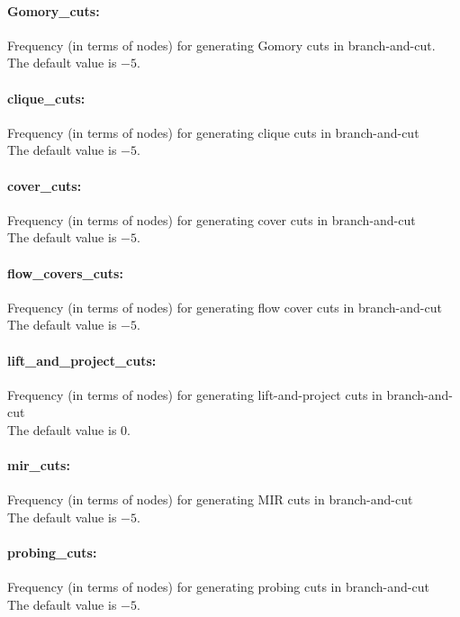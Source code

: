 \paragraph{Gomory\_cuts:} Frequency (in terms of nodes) for generating Gomory cuts in branch-and-cut. $\;$ \\
The default value is $-5$.

\paragraph{clique\_cuts:} Frequency (in terms of nodes) for generating clique cuts in branch-and-cut $\;$ \\
The default value is $-5$.

\paragraph{cover\_cuts:} Frequency (in terms of nodes) for generating cover cuts in branch-and-cut $\;$ \\
The default value is $-5$.

\paragraph{flow\_covers\_cuts:} Frequency (in terms of nodes) for generating flow cover cuts in branch-and-cut $\;$ \\
The default value is $-5$.

\paragraph{lift\_and\_project\_cuts:} Frequency (in terms of nodes) for generating lift-and-project cuts in branch-and-cut $\;$ \\
The default value is $0$.

\paragraph{mir\_cuts:} Frequency (in terms of nodes) for generating MIR cuts in branch-and-cut $\;$ \\
The default value is $-5$.

\paragraph{probing\_cuts:} Frequency (in terms of nodes) for generating probing cuts in branch-and-cut $\;$ \\
The default value is $-5$.

